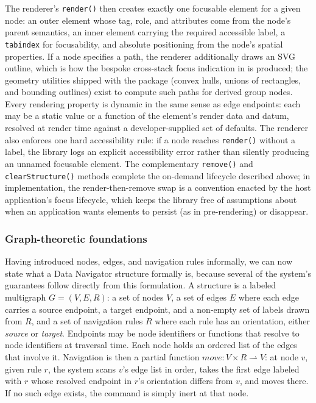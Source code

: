 \documentclass[12pt]{cmuthesis}
\begin{document}
The renderer's \texttt{render()} then creates exactly one focusable element for a given node: an outer element whose tag, role, and attributes come from the node's parent semantics, an inner element carrying the required accessible label, a \texttt{tabindex} for focusability, and absolute positioning from the node's spatial properties. If a node specifies a path, the renderer additionally draws an SVG outline, which is how the bespoke cross-stack focus indication in  is produced; the geometry utilities shipped with the package (convex hulls, unions of rectangles, and bounding outlines) exist to compute such paths for derived group nodes. Every rendering property is dynamic in the same sense as edge endpoints: each may be a static value or a function of the element's render data and datum, resolved at render time against a developer-supplied set of defaults. The renderer also enforces one hard accessibility rule: if a node reaches \texttt{render()} without a label, the library logs an explicit accessibility error rather than silently producing an unnamed focusable element. The complementary \texttt{remove()} and \texttt{clearStructure()} methods complete the on-demand lifecycle described above; in implementation, the render-then-remove swap is a convention enacted by the host application's focus lifecycle, which keeps the library free of assumptions about when an application wants elements to persist (as in pre-rendering) or disappear.

\subsubsection{Graph-theoretic foundations}

Having introduced nodes, edges, and navigation rules informally, we can now state what a Data Navigator structure formally is, because several of the system's guarantees follow directly from this formulation. A structure is a labeled multigraph $G = (V, E, R)$: a set of nodes $V$, a set of edges $E$ where each edge carries a source endpoint, a target endpoint, and a non-empty set of labels drawn from $R$, and a set of navigation rules $R$ where each rule has an orientation, either \textit{source} or \textit{target}. Endpoints may be node identifiers or functions that resolve to node identifiers at traversal time. Each node holds an ordered list of the edges that involve it. Navigation is then a partial function $\mathit{move}: V \times R \rightharpoonup V$: at node $v$, given rule $r$, the system scans $v$'s edge list in order, takes the first edge labeled with $r$ whose resolved endpoint in $r$'s orientation differs from $v$, and moves there. If no such edge exists, the command is simply inert at that node.
\end{document}
